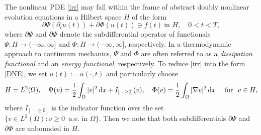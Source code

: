\documentclass[reqno,10pt]{amsart}
\begin{document}
The nonlinear PDE \eqref{irr} may fall within the frame of abstract
doubly nonlinear evolution equations in a Hilbert space $H$ of the form
\begin{equation}\label{DNE}
\partial \Psi (\partial_t u(t)) + \partial \Phi(u(t)) \ni f(t) \ \mbox{
in } H, \quad 0 < t < T,
\end{equation}
where $\partial \Psi$ and $\partial \Phi$ denote the subdifferential
operator of functionals $\Psi : H \to (-\infty,\infty]$ and $\Phi : H \to
(-\infty,\infty]$, respectively. In a thermodynamic approach to
continuum mechanics, $\Psi$ and $\Phi$ are often referred to as a
\emph{dissipation functional} and an \emph{energy functional},
respectively. To reduce \eqref{irr} into the form \eqref{DNE}, we
set $u(t) := u(\cdot,t)$ and particularly choose
$$
H = L^2(\Omega), \quad
\Psi(v) = \dfrac 1 2 \int_\Omega |v|^2 \, {\text{\rm d}} x + {I_{[~\cdot\, \geq 0]}}(v), \quad
\Phi(v) = \dfrac 1 2 \int_\Omega |\nabla v|^2 \, {\text{\rm d}} x
\quad \mbox{ for } \ v \in H,
$$ 
where ${I_{[~\cdot\, \geq 0]}}$ is the indicator function over the set $\{ v \in L^2(\Omega)
\colon v \geq 0 \ \mbox{ a.e.~in } \Omega\}$. Then we note that both
subdifferentials $\partial\Psi$ and $\partial \Phi$ are unbounded in $H$.
\end{document}
